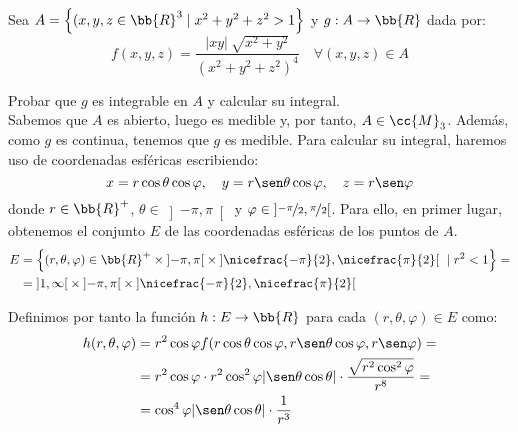 \begin{ejercicio}
    Sea $A=\left\{(x,y,z\in \bb{R}^3 \mid x^2+y^2+z^2>1\right\}$ y $g:A\to \bb{R}$ dada por:
    $$f(x,y,z)=\dfrac{|xy|~\sqrt{x^2+y^2}}{(x^2+y^2+z^2)^4} \quad \forall (x,y,z)\in A$$

    Probar que $g$ es integrable en $A$ y calcular su integral.\\

    Sabemos que $A$ es abierto, luego es medible y, por tanto, $A\in \cc{M}_3$. Además, como $g$ es continua, tenemos que $g$ es medible.
    Para calcular su integral, haremos uso de coordenadas esféricas escribiendo:
    \begin{equation*}
        x = r\cos\theta\cos\varphi, \quad y = r\sen\theta\cos\varphi, \quad z = r\sen\varphi
    \end{equation*}
    donde $r\in \bb{R}^+$, $\theta\in \left]-\pi,\pi\right[$ y $\varphi\in \left]\nicefrac{-\pi}{2}, \nicefrac{\pi}{2}\right[$. Para ello, en primer lugar, obtenemos el conjunto $E$ de las coordenadas esféricas de los puntos de $A$.
    \begin{align*}
        E &= \left\{ (r, \theta, \varphi) \in \bb{R}^+\times \left]-\pi, \pi\right[\times \left]\nicefrac{-\pi}{2}, \nicefrac{\pi}{2}\right[ ~\mid r^2 < 1 \right\} =\\
        &= \left]1, \infty\right[\times \left]-\pi, \pi\right[\times \left]\nicefrac{-\pi}{2}, \nicefrac{\pi}{2}\right[
    \end{align*}

    Definimos por tanto la función $h: E \to \bb{R}$ para cada $(r, \theta, \varphi) \in E$ como:
    \begin{align*}
        h(r, \theta, \varphi) &= r^2\cos\varphi f(r\cos\theta\cos\varphi, r\sen\theta\cos\varphi, r\sen\varphi)=\\
        &= r^2\cos\varphi\cdot r^2\cos^2\varphi|\sen\theta\cos\theta|\cdot \dfrac{\sqrt{r^2\cos^2\varphi}}{r^8} =\\
        &= \cos^4\varphi|\sen\theta\cos\theta|\cdot \dfrac{1}{r^3}
    \end{align*}


\end{ejercicio}
